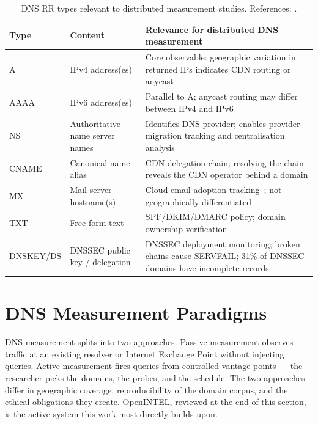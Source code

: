 \begin{table}[H]
\centering
\small
\begin{tabularx}{\linewidth}{p{1.8cm} p{4.1cm} X}
\toprule
\textbf{Type} & \textbf{Content} & \textbf{Relevance for distributed \ac{DNS} measurement} \\
\midrule
\ac{A}     & \ac{IPv4} address(es)                  & Core observable: geographic variation in returned \ac{IP}s indicates \ac{CDN} routing or anycast \\
\ac{AAAA}  & \ac{IPv6} address(es)                  & Parallel to \ac{A}; anycast routing may differ between \ac{IPv4} and \ac{IPv6}~\cite{Bortzmeyer2013} \\
\ac{NS}    & Authoritative name server names   & Identifies \ac{DNS} provider; enables provider migration tracking and centralisation analysis~\cite{Xu2023} \\
\ac{CNAME} & Canonical name alias              & \ac{CDN} delegation chain; resolving the chain reveals the \ac{CDN} operator behind a domain \\
\ac{MX}    & Mail server hostname(s)           & Cloud email adoption tracking~\cite{vanRijswijk2016}; not geographically differentiated \\
\ac{TXT}   & Free-form text                    & \ac{SPF}/\ac{DKIM}/\ac{DMARC} policy; domain ownership verification \\
DNSKEY/DS & \ac{DNSSEC} public key / delegation & \ac{DNSSEC} deployment monitoring; broken chains cause SERVFAIL; 31\% of \ac{DNSSEC} domains have incomplete records~\cite{vanRijswijk2016,Chung2017} \\
\bottomrule
\end{tabularx}
\caption{\ac{DNS} \ac{RR} types relevant to distributed measurement studies. References: \cite{RFC1034,RFC1035}.}
\label{tab:rr_types}
\end{table}

\section{DNS Measurement Paradigms}
\label{sec:2.2}

\ac{DNS} measurement splits into two approaches. Passive measurement observes traffic at an existing resolver or Internet Exchange Point without injecting queries. Active measurement fires queries from controlled vantage points — the researcher picks the domains, the probes, and the schedule. The two approaches differ in geographic coverage, reproducibility of the domain corpus, and the ethical obligations they create. OpenINTEL, reviewed at the end of this section, is the active system this work most directly builds upon.

